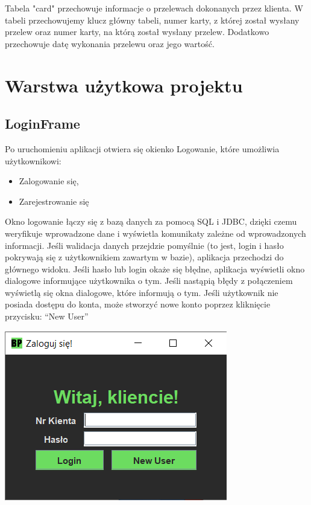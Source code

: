 \documentclass[12pt, letterpaper]{article}
\begin{document}
\quad Tabela "card"  przechowuje informacje o przelewach dokonanych przez klienta. W tabeli przechowujemy klucz główny tabeli, numer karty, z której został wysłany przelew oraz numer karty, 
na którą został wysłany przelew. Dodatkowo przechowuje datę wykonania przelewu oraz jego wartość.

\newpage


\section{Warstwa użytkowa projektu}

\subsection{LoginFrame}
\quad Po uruchomieniu aplikacji otwiera się okienko Logowanie, które umożliwia użytkownikowi:

\begin{itemize}
\item Zalogowanie się,
\item Zarejestrowanie się
\end{itemize}

\quad Okno logowanie łączy się z bazą danych za pomocą SQL i JDBC, dzięki czemu weryfikuje wprowadzone dane i wyświetla komunikaty zależne od wprowadzonych informacji. Jeśli walidacja danych przejdzie pomyślnie (to jest, login i hasło pokrywają się z użytkownikiem zawartym w bazie), aplikacja przechodzi do głównego widoku. Jeśli hasło lub login okaże się błędne, aplikacja wyświetli okno dialogowe informujące użytkownika o tym. Jeśli nastąpią błędy z połączeniem wyświetlą się okna dialogowe, które informują o tym. 
Jeśli użytkownik nie posiada dostępu do konta, może stworzyć nowe konto poprzez kliknięcie przycisku: “New User”\\

\begin{center}
	\includegraphics[scale=0.8]{login}
\end{center}
\end{document}

